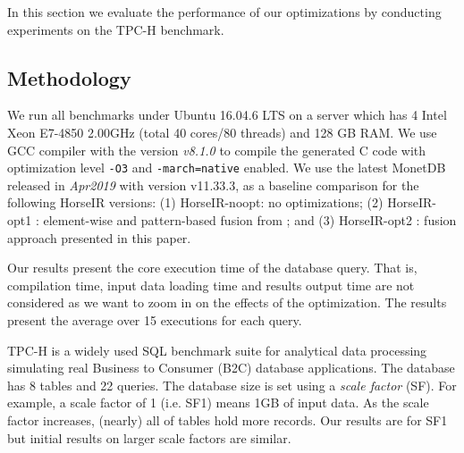 In this section we evaluate the performance of our optimizations by conducting
experiments on the TPC-H benchmark. 

\subsection{Methodology}

We run all benchmarks under Ubuntu 16.04.6 LTS on a server which has 4 Intel
Xeon E7-4850 2.00GHz (total 40 cores/80 threads) and 128 GB RAM.
We use GCC compiler with the version \textit{v8.1.0} to compile the generated C
code with optimization level \texttt{-O3} and \texttt{-march=native} enabled.
We use the latest MonetDB~\cite{IdreosS2012} released in \textit{Apr2019} with
version v11.33.3, as a baseline comparison for the following HorseIR versions:
(1) HorseIR-noopt: no optimizations;
(2) HorseIR-opt1 : element-wise and pattern-based fusion from \OldPaper; and
(3) HorseIR-opt2 : fusion approach presented in this paper.

Our results present the core execution time of the database query. That is,
compilation time, input data loading time and results output time are not considered
as we want to zoom in on the effects of the optimization. The results present
the average over 15 executions for each query.


TPC-H \cite{TPCH2017} is a widely used SQL benchmark suite for analytical data
processing simulating real Business to Consumer (B2C) database applications. The 
database has 8 tables and 22 queries. The database size is set
using a \textit{scale factor} (SF). For example, a scale factor of 1
(i.e. SF1) means 1GB of input data. As the scale factor increases, (nearly) all
of tables hold more records. Our results are for SF1 but initial results
on larger scale factors are similar.



